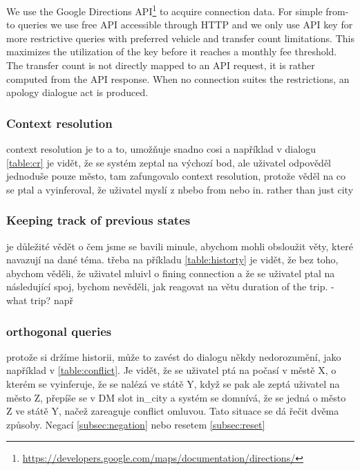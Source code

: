 We use the Google Directions API\footnote{\url{https://developers.google.com/maps/documentation/directions/}} to acquire connection data.
For simple from-to queries we use free API accessible through HTTP and we only use API key for more restrictive queries with preferred vehicle and transfer count limitations.
This maximizes the utilization of the key before it reaches a monthly fee threshold.
The transfer count is not directly mapped to an API request, it is rather computed from the API response.
When no connection suites the restrictions, an apology dialogue act is produced.





\subsubsection{Context resolution}

context resolution je to a to, umožňuje snadno cosi a například v dialogu \ref{table:cr} je vidět, že se systém zeptal na výchozí bod, ale uživatel odpověděl jednoduše pouze město, tam zafungovalo context resolution, protože věděl na co se ptal a vyinferoval, že uživatel myslí z nbebo from nebo in. rather than just city


\subsubsection{Keeping track of previous states}

je důležité vědět o čem jsme se bavili minule, abychom mohli obsloužit věty, které navazují na dané téma. třeba na příkladu \ref{table:historty} je vidět, že bez toho, abychom věděli, že uživatel mluivl o fining connection a že se uživatel ptal na následující spoj, bychom nevěděli, jak reagovat na větu duration of the trip. - what trip? např

\subsubsection{orthogonal queries}

protože si držíme historii, může to zavést do dialogu někdy nedorozumění, jako například v \ref{table:conflict}. Je vidět, že se uživatel ptá na počasí v městě X, o kterém se vyinferuje, že se nalézá ve státě Y, když se pak ale zeptá uživatel na město Z, přepíše se v DM slot in\_city a systém se domnívá, že se jedná o město Z ve státě Y, načež zareaguje conflict omluvou. Tato situace se dá řečit dvěma způsoby. Negací \ref{subsec:negation} nebo resetem \ref{subsec:reset}

